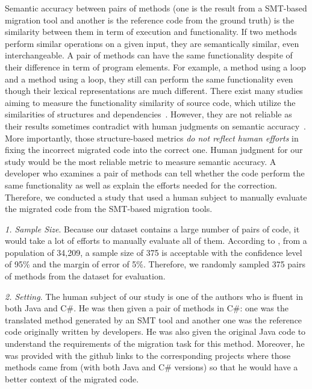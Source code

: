 %
Semantic accuracy between pairs of methods (one is the result from a
SMT-based migration tool and another is the reference code from the
ground truth) is the similarity between them in term of execution and
functionality. If two methods perform similar operations on a given
input, they are semantically similar, even interchangeable. A pair of
methods can have the same functionality despite of their difference in
term of program elements.
%
For example, a method using a  loop and a method using a
 loop, they still can perform the same functionality even
though their lexical representations are much different. There exist
many studies aiming to measure the functionality similarity of source
code, which utilize the similarities of structures and
dependencies~\cite{clone-tse07,roy09,ducasse99,baker97,ccfinder,cpminer,baxter98,deckard,deckard2,horwitz01}.
%
However, they are not reliable as their results sometimes contradict
with human judgments on semantic accuracy~\cite{fse14-higo}. More
importantly, those structure-based metrics {\em do not reflect human
  efforts} in fixing the incorrect migrated code into the correct one.
%
Human judgment for our study would be the most reliable metric to
measure semantic accuracy. A developer who examines a pair of methods
can tell whether the code perform the same functionality as well as
explain the efforts needed for the correction. Therefore, we conducted
a study that used a human subject to manually evaluate the migrated
code from the SMT-based migration tools.


\emph{1. Sample Size}. Because our dataset contains a large number of
pairs of code, it would take a lot of efforts to manually evaluate all
of them. According to \cite{website}, from a population of 34,209, a
sample size of 375 is acceptable with the confidence level of 95\% and
the margin of error of 5\%. Therefore, we randomly sampled 375 pairs
of methods from the dataset for evaluation.

\emph{2. Setting}. The human subject of our study is one of the
authors who is fluent in both Java and C\#. He was then given a pair
of methods in C\#: one was the translated method generated by an SMT
tool and another one was the reference code originally written by
developers.
He was also given the original Java code to understand the
requirements of the migration task for this method. Moreover, he was
provided with the github links to the corresponding projects where
those methods came from (with both Java and C\# versions) so that he
would have a better context of the migrated code.

